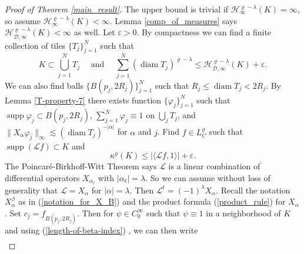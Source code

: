 \documentclass[12pt,a4paper,reqno]{amsart}
\DeclareMathOperator{\supp}{supp}
\renewcommand{\L}{\mathcal{L}}
\renewcommand{\k}{\kappa}
\renewcommand{\l}{\lambda}
\renewcommand{\a}{\alpha}
\newcommand{\diam}{\operatorname{diam}}
\numberwithin{equation}{section}
\theoremstyle{definition}
\begin{document}
\begin{proof}[Proof of Theorem \ref{main_result}]
The upper bound is trivial if $\mathcal{H}_{\infty}^{\varrho -\l}(K) = \infty$, so assume $\mathcal{H}_{\infty}^{\varrho -\l}(K) < \infty$. Lemma \ref{comp_of_measures} says $\mathcal{H}_{\mathcal{D},\infty}^{\varrho -\l}(K) < \infty$ as well. Let $\varepsilon > 0$. By compactness we can find a finite collection of tiles $\{T_j\}_{j=1}^N$ such that 
$$K \subset \bigcup_{j=1}^N T_j \quad \text{ and } \quad \sum_{j=1}^N (\diam T_j)^{\varrho - \l} \leq \mathcal{H}_{\mathcal{D},\infty}^{\varrho-\l}(K) + \varepsilon.$$ 
We can also find balls $\{ B(p_j , 2R_j)\}_{j=1}^N$ such that $R_j \leq \diam T_j < 2 R_j$. By Lemma \ref{T-property-7} there exists function $\{ \varphi_j\}_{j=1}^N$ such that $\supp \varphi_j \subset B(p_j , 2R_j)$, $\sum_{j=1}^N \varphi_j \equiv 1$ on $\bigcup_j T_j$, and $\| X_{\a} \varphi_j \|_{\infty} \lesssim (\diam T_j)^{-|\a|}$ for $\a$ and $j$. Find $f \in L_C^{\varrho}$ such that $\supp (\L f) \subset K$ and \begin{equation}\label{upper_bound_on_cap} \k^{\varrho}(K) \leq |\langle \L f, 1 \rangle | + \varepsilon.\end{equation}
The Poincar\'{e}-Birkhoff-Witt Theorem says $\L$ is a linear combination of differential operators $X_{\a_{\ell}}$ with $|\a_{\ell}| = \l$. So we can assume without loss of generality that $\L = X_{\a}$ for $|\a| = \l$. Then $\L^t = (-1)^{\l} X_{\a}$. Recall the notation $X_{\a}^{\beta}$ as in (\ref{notation_for_X_B}) and the product formula (\ref{product_rule}) for $X_{\a}$. Set $c_j = f_{B(p_j , 2R_j)}$.
Then for $\psi \in C_0^{\infty}$ such that $\psi \equiv 1$ in a neighborhood of $K$ and using (\ref{length-of-beta-index}) , we can then write
\begin{align}

\end{align}
\end{proof}
\end{document}
